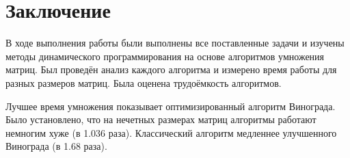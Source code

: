 \chapter*{Заключение}

В ходе выполнения работы были выполнены все поставленные задачи и изучены методы динамического программирования на основе алгоритмов умножения матриц. Был проведён анализ каждого алгоритма и измерено время работы для разных размеров матриц. Была оценена трудоёмкость алгоритмов.

Лучшее время умножения показывает оптимизированный алгоритм Винограда. Было установлено, что на нечетных размерах матриц алгоритмы работают немногим хуже (в 1.036 раза). Классический алгоритм медленнее улучшенного Винограда (в 1.68 раза).